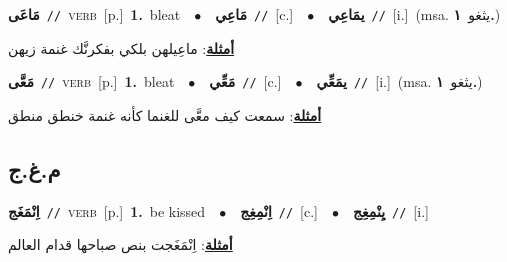 \documentclass[10pt,a4paper,twoside]{article} %
\begin{document}
\begin{multicols}{2}
{\setlength\topsep{0pt}\textbf{\foreignlanguage{arabic}{مَاعَى}}\ {\color{gray}\texttt{//}\color{black}}\ \textsc{verb}\ [p.]\ \textbf{1.}~bleat\ \ $\bullet$\ \ \setlength\topsep{0pt}\textbf{\foreignlanguage{arabic}{مَاعِي}}\ {\color{gray}\texttt{//}\color{black}}\ [c.]\ \ $\bullet$\ \ \setlength\topsep{0pt}\textbf{\foreignlanguage{arabic}{يمَاعِي}}\ {\color{gray}\texttt{//}\color{black}}\ [i.]\ \color{gray}(msa. \foreignlanguage{arabic}{يثغو}~\foreignlanguage{arabic}{\textbf{١.}})\color{black}\  \begin{flushright}\color{gray}\foreignlanguage{arabic}{\textbf{\underline{\foreignlanguage{arabic}{أمثلة}}}: ماعِيلهن بلكي بفكرنَّك غنمة زيهن}\end{flushright}\color{black}} \vspace{2mm}

{\setlength\topsep{0pt}\textbf{\foreignlanguage{arabic}{مَعَّى}}\ {\color{gray}\texttt{//}\color{black}}\ \textsc{verb}\ [p.]\ \textbf{1.}~bleat\ \ $\bullet$\ \ \setlength\topsep{0pt}\textbf{\foreignlanguage{arabic}{مَعِّي}}\ {\color{gray}\texttt{//}\color{black}}\ [c.]\ \ $\bullet$\ \ \setlength\topsep{0pt}\textbf{\foreignlanguage{arabic}{يمَعِّي}}\ {\color{gray}\texttt{//}\color{black}}\ [i.]\ \color{gray}(msa. \foreignlanguage{arabic}{يثغو}~\foreignlanguage{arabic}{\textbf{١.}})\color{black}\  \begin{flushright}\color{gray}\foreignlanguage{arabic}{\textbf{\underline{\foreignlanguage{arabic}{أمثلة}}}: سمعت كيف معَّى للغنما كأنه غنمة خنطق منطق}\end{flushright}\color{black}} \vspace{2mm}

\vspace{-3mm}
\subsection*{\color{blue}\foreignlanguage{arabic}{م.غ.ج}\color{blue}{}} 

{\setlength\topsep{0pt}\textbf{\foreignlanguage{arabic}{اِنْمَغَج}}\ {\color{gray}\texttt{//}\color{black}}\ \textsc{verb}\ [p.]\ \textbf{1.}~be kissed\ \ $\bullet$\ \ \setlength\topsep{0pt}\textbf{\foreignlanguage{arabic}{اِنْمِغِج}}\ {\color{gray}\texttt{//}\color{black}}\ [c.]\ \ $\bullet$\ \ \setlength\topsep{0pt}\textbf{\foreignlanguage{arabic}{يِنْمِغِج}}\ {\color{gray}\texttt{//}\color{black}}\ [i.]\  \begin{flushright}\color{gray}\foreignlanguage{arabic}{\textbf{\underline{\foreignlanguage{arabic}{أمثلة}}}: اِنْمَغَجت بنص صباحها قدام العالم}\end{flushright}\color{black}} \vspace{2mm}


\end{multicols}
\end{document}
